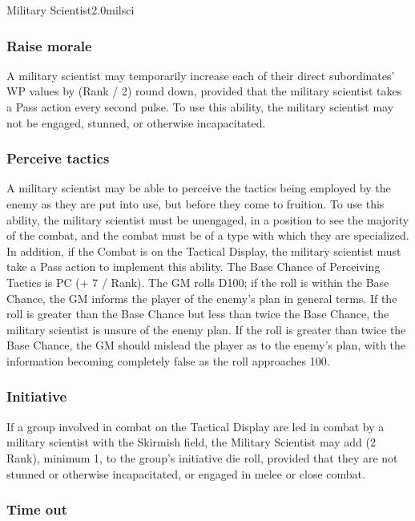 \begin{skill}{Military Scientist}{2.0}{milsci}
\subsubsection{Raise morale}

A military scientist may temporarily increase each of their direct
subordinates' WP values by (Rank / 2) round down, provided that the
military scientist takes a Pass action every second pulse.  To use
this ability, the military scientist may not be engaged, stunned, or
otherwise incapacitated.

\subsubsection{Perceive tactics}

A military scientist may be able to perceive the tactics being
employed by the enemy as they are put into use, but before they come
to fruition.  To use this ability, the military scientist must be
unengaged, in a position to see the majority of the combat, and the
combat must be of a type with which they are specialized. In addition,
if the Combat is on the Tactical Display, the military scientist must
take a Pass action to implement this ability.  The Base Chance of
Perceiving Tactics is PC (+ 7 / Rank).  The GM rolls D100; if the roll
is within the Base Chance, the GM informs the player of the enemy's
plan in general terms.  If the roll is greater than the Base Chance
but less than twice the Base Chance, the military scientist is unsure
of the enemy plan.  If the roll is greater than twice the Base Chance,
the GM should mislead the player as to the enemy's plan, with the
information becoming completely false as the roll approaches 100.

\subsubsection{Initiative}

If a group involved in combat on the Tactical Display are led in
combat by a military scientist with the Skirmish field, the Military
Scientist may add (2 \x Rank), minimum 1, to the group's initiative die
roll, provided that they are not stunned or otherwise incapacitated,
or engaged in melee or close combat.

\subsubsection{Time out}


\end{skill}
